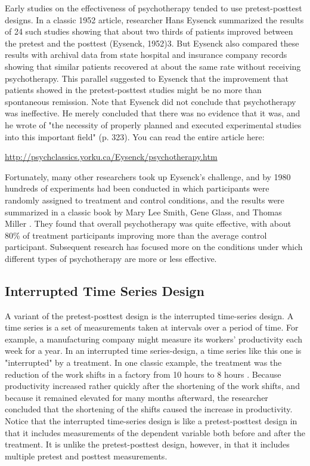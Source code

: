 \color{fgcolor}\begin{kframe}

Early studies on the effectiveness of psychotherapy tended to use pretest-posttest designs. In a classic 1952 article, researcher Hans Eysenck summarized the results of 24 such studies showing that about two thirds of patients improved between the pretest and the posttest (Eysenck, 1952)3. But Eysenck also compared these results with archival data from state hospital and insurance company records showing that similar patients recovered at about the same rate without receiving psychotherapy. This parallel suggested to Eysenck that the improvement that patients showed in the pretest-posttest studies might be no more than spontaneous remission. Note that Eysenck did not conclude that psychotherapy was ineffective. He merely concluded that there was no evidence that it was, and he wrote of "the necessity of properly planned and executed experimental studies into this important field" (p. 323). You can read the entire article here:

\url{http://psychclassics.yorku.ca/Eysenck/psychotherapy.htm}

Fortunately, many other researchers took up Eysenck's challenge, and by 1980 hundreds of experiments had been conducted in which participants were randomly assigned to treatment and control conditions, and the results were summarized in a classic book by Mary Lee Smith, Gene Glass, and Thomas Miller \citep{smith_benefits_1980}. They found that overall psychotherapy was quite effective, with about 80\% of treatment participants improving more than the average control participant. Subsequent research has focused more on the conditions under which different types of psychotherapy are more or less effective.
\end{kframe}

\subsection{Interrupted Time Series Design}


A variant of the pretest-posttest design is the interrupted time-series design. A time series is a set of measurements taken at intervals over a period of time. For example, a manufacturing company might measure its workers' productivity each week for a year. In an interrupted time series-design, a time series like this one is "interrupted" by a treatment. In one classic example, the treatment was the reduction of the work shifts in a factory from 10 hours to 8 hours \citep{cook_quasi-experimentation:_1979}. Because productivity increased rather quickly after the shortening of the work shifts, and because it remained elevated for many months afterward, the researcher concluded that the shortening of the shifts caused the increase in productivity. Notice that the interrupted time-series design is like a pretest-posttest design in that it includes measurements of the dependent variable both before and after the treatment. It is unlike the pretest-posttest design, however, in that it includes multiple pretest and posttest measurements.


